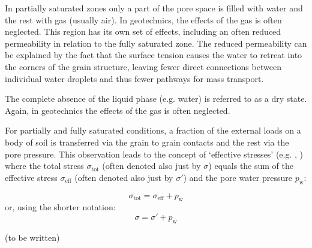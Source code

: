 In partially saturated zones only a part of the pore space is filled with water
and the rest with gas (usually air). In geotechnics, the effects of the gas is
often neglected. This region has its own set of effects, including an often
reduced permeability in relation to the fully saturated zone. The reduced
permeability can be explained by the fact that the surface tension causes the
water to retreat into the corners of the grain structure, leaving fewer direct
connections between individual water droplets and thus fewer pathways for mass
transport.

The complete absence of the liquid phase (e.g. water) is referred to as a dry
state. Again, in geotechnics the effects of the gas is often neglected.

For partially and fully saturated conditions, a fraction of the external loads
on a body of soil is transferred via the grain to grain contacts and the rest
via the pore pressure. This observation leads to the concept of ‘effective
stresses’ (e.g. \cite{doi:10.1680/geot.1962.12.2.125},
\cite{doi:10.1680/sposm.02050.0014}) where the total stress
$\sigma_\mathrm{tot}$ (often denoted also just by $\sigma$) equals the sum of
the effective stress $\sigma_\mathrm{eff}$ (often denoted also just by
$\sigma'$) and the pore water pressure $p_\mathrm{w}$:

\begin{equation}
  \sigma_\mathrm{tot} = \sigma_\mathrm{eff} + p_\mathrm{w}
\end{equation}
or, using the shorter notation:
\begin{equation}
  \sigma = \sigma' + p_\mathrm{w}
\end{equation}

(to be written)

% 
% 
% 
% 
% 
